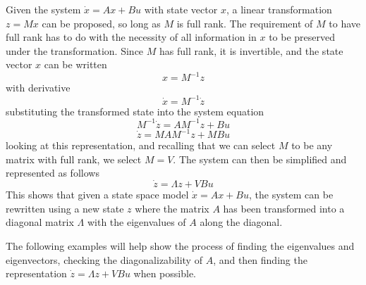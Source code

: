 Given the system $\dot{x}=Ax+Bu$ with state vector $x$, a linear transformation $z=Mx$ can be proposed, so long as $M$ is full rank.
The requirement of $M$ to have full rank has to do with the necessity of all information in $x$ to be preserved under the transformation.
Since $M$ has full rank, it is invertible, and the state vector $x$ can be written
\begin{equation*}
  x=M^{-1}z
\end{equation*}
with derivative
\begin{equation*}
  \dot{x}=M^{-1}\dot{z}
\end{equation*}
substituting the transformed state into the system equation
\begin{equation*}
  M^{-1}\dot{z}=AM^{-1}z+Bu
\end{equation*}
\begin{equation*}
  \dot{z}=MAM^{-1}z+MBu
\end{equation*}
looking at this representation, and recalling that we can select $M$ to be any matrix with full rank, we select $M=V$.
The system can then be simplified and represented as follows
\begin{equation*}
  \dot{z}=\Lambda z+VBu
\end{equation*}
This shows that given a state space model $\dot{x}=Ax+Bu$, the system can be rewritten using a new state $z$ where the matrix $A$ has been transformed into a diagonal matrix $\Lambda$ with the eigenvalues of $A$ along the diagonal.

The following examples will help show the process of finding the eigenvalues and eigenvectors, checking the diagonalizability of $A$, and then finding the representation $\dot{z}=\Lambda z+VBu$ when possible.

